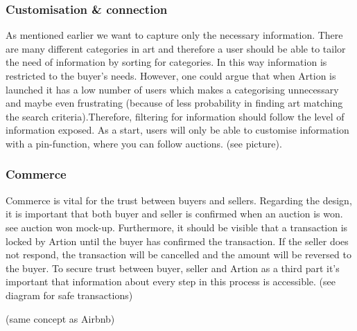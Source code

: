\subsubsection*{Customisation \& connection}
As mentioned earlier we want to capture only the necessary information. There are many different categories in art and therefore a user should be able to tailor the need of information by sorting for categories. In this way information is restricted to the buyer’s needs. However, one could argue that when Artion is launched it has a low number of users which makes a categorising unnecessary and maybe even frustrating (because of less probability in finding art matching the search criteria).Therefore, filtering for information should follow the level of information exposed. As a start, users will only be able to customise information with a pin-function, where you can follow auctions. (see picture).

\subsubsection*{Commerce}
Commerce is vital for the trust between buyers and sellers. Regarding the design, it is important that both buyer and seller is confirmed when an auction is won. see auction won mock-up. Furthermore, it should be visible that a transaction is locked by Artion until the buyer has confirmed the transaction. If the seller does not respond, the transaction will be cancelled and the amount will be reversed to the buyer. To secure trust between buyer, seller and Artion as a third part it’s important that information about every step in this process is accessible. (see diagram for safe transactions)

(same concept as Airbnb)\\